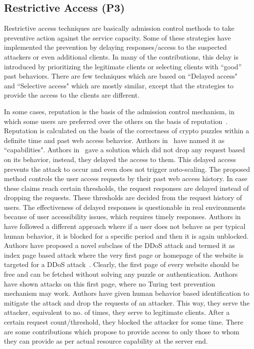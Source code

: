 \documentclass[final,5p,times,twocolumn]{elsarticle}
\begin{document}
\subsection{Restrictive Access (P3)}
{Restrictive access techniques are basically admission control methods to take preventive action against the service capacity. Some of these strategies have implemented the prevention by delaying responses/access to the suspected attackers or even additional clients. In many of the contributions, this delay is introduced by prioritizing the legitimate clients or selecting clients with ``good'' past behaviors. There are few techniques which are based on ``Delayed access" and ``Selective access" which are mostly similar, except that the strategies to provide the access to the clients are different.}

In some cases, reputation is the basis of the admission control mechanism, in which some users are preferred over the others on the basis of reputation~\cite{spow}. Reputation is calculated on the basis of the correctness of crypto puzzles within a definite time and past web access behavior. Authors in~\cite{spow} have named it as ``capabilities". Authors in~\cite{baig} gave a solution which did not drop any request based on its behavior, instead, they delayed the access to them. This delayed access prevents the attack to occur and even does not trigger auto-scaling. The proposed method controls the user access requests by their past web access history. In case these claims reach certain thresholds, the request responses are delayed instead of dropping the requests. These thresholds are decided from the request history of users. The effectiveness of delayed responses is questionable in real environments because of user accessibility issues, which requires timely responses. Authors in ~\cite{index} have followed a different approach where if a user does not behave as per typical human behavior, it is blocked for a specific period and then it is again unblocked. Authors have proposed a novel subclass of the DDoS attack and termed it as index page based attack where the very first page or homepage of the website is targeted for a DDoS attack~\cite{index}. Clearly, the first page of every website should be free and can be fetched without solving any puzzle or authentication. Authors have shown attacks on this first page, where no Turing test prevention mechanism may work. Authors have given human behavior based identification to mitigate the attack and drop the requests of an attacker. This way, they serve the attacker, equivalent to no. of times, they serve to legitimate clients. After a certain request count/threshold, they blocked the attacker for some time. There are some contributions which propose to provide access to only those to whom they can provide as per actual resource capability at the server end. 
\end{document}
